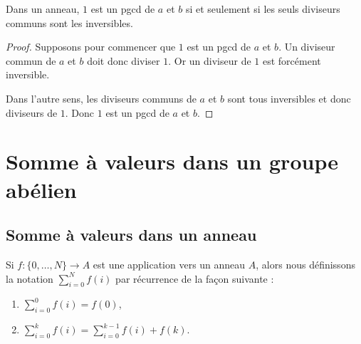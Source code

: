 \begin{lemma}
    Dans un anneau, \( 1\) est un pgcd de \( a\) et \( b\) si et seulement si les seuls diviseurs communs sont les inversibles.
\end{lemma}

\begin{proof}
    Supposons pour commencer que \( 1\) est un pgcd de \( a\) et \( b\). Un diviseur commun de \( a\) et \( b\) doit donc diviser \( 1\). Or un diviseur de \( 1\) est forcément inversible.

    Dans l'autre sens, les diviseurs communs de \( a\) et \( b\) sont tous inversibles et donc diviseurs de \( 1\). Donc \( 1\) est un pgcd de \( a\) et \( b\).
\end{proof}


\section{Somme à valeurs dans un groupe abélien}

\subsection{Somme à valeurs dans un anneau}

\begin{definition}      \label{DEFooNEVNooJlmJOC}
    Si \( f\colon \{ 0,\ldots, N \}\to A\) est une application vers un anneau \( A\), alors nous définissons la notation \( \sum_{i=0}^Nf(i)\) par récurrence de la façon suivante :
    \begin{enumerate}
        \item
            \( \sum_{i=0}^0f(i)=f(0)\),
        \item
            \( \sum_{i=0}^{k}f(i)=\sum_{i=0}^{k-1}f(i)+f(k)\).
    \end{enumerate}
\end{definition}

